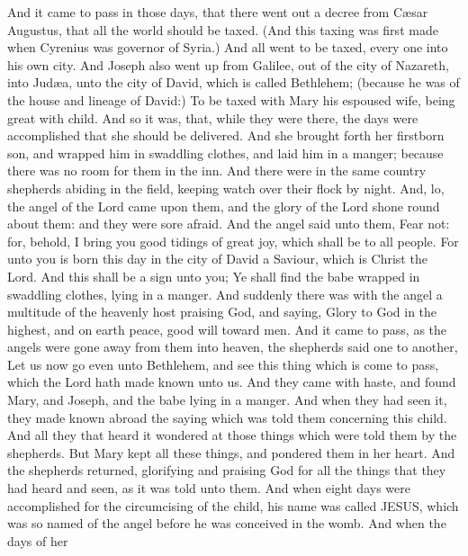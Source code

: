  And it came to pass in those days, that there went out a
decree from Cæsar Augustus, that all the world should be taxed.
 (And this taxing was first made when Cyrenius was governor
of Syria.)  And all went to be taxed, every one into his own
city.  And Joseph also went up from Galilee, out of the city
of Nazareth, into Judæa, unto the city of David, which is called
Bethlehem; (because he was of the house and lineage of David:)
 To be taxed with Mary his espoused wife, being great with
child.  And so it was, that, while they were there, the days
were accomplished that she should be delivered.  And she
brought forth her firstborn son, and wrapped him in swaddling clothes,
and laid him in a manger; because there was no room for them in the inn.
 And there were in the same country shepherds abiding in the
field, keeping watch over their flock by night.  And, lo,
the angel of the Lord came upon them, and the glory of the Lord shone
round about them: and they were sore afraid.  And the angel
said unto them, Fear not: for, behold, I bring you good tidings of great
joy, which shall be to all people.  For unto you is born
this day in the city of David a Saviour, which is Christ the Lord.
 And this shall be a sign unto you; Ye shall find the babe
wrapped in swaddling clothes, lying in a manger.  And
suddenly there was with the angel a multitude of the heavenly host
praising God, and saying,  Glory to God in the highest, and
on earth peace, good will toward men.  And it came to pass,
as the angels were gone away from them into heaven, the shepherds said
one to another, Let us now go even unto Bethlehem, and see this thing
which is come to pass, which the Lord hath made known unto us.
 And they came with haste, and found Mary, and Joseph, and
the babe lying in a manger.  And when they had seen it,
they made known abroad the saying which was told them concerning this
child.  And all they that heard it wondered at those things
which were told them by the shepherds.  But Mary kept all
these things, and pondered them in her heart.  And the
shepherds returned, glorifying and praising God for all the things that
they had heard and seen, as it was told unto them.  And
when eight days were accomplished for the circumcising of the child, his
name was called JESUS, which was so named of the angel before he was
conceived in the womb.  And when the days of her
